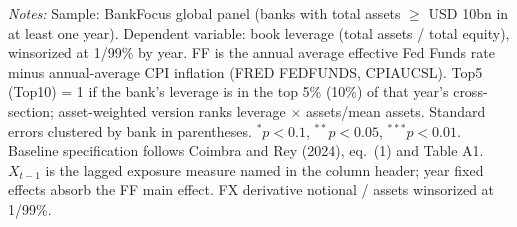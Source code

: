 \begin{table}[htbp]
\begin{threeparttable}
\begin{tablenotes}[flushleft]
\item \textit{Notes:} Sample: BankFocus global panel (banks with total assets $\geq$ USD 10bn in at least one year). Dependent variable: book leverage (total assets / total equity), winsorized at 1/99\% by year. FF is the annual average effective Fed Funds rate minus annual-average CPI inflation (FRED FEDFUNDS, CPIAUCSL). Top5 (Top10) = 1 if the bank's leverage is in the top 5\% (10\%) of that year's cross-section; asset-weighted version ranks leverage $\times$ assets/mean assets. Standard errors clustered by bank in parentheses. $^{*}p<0.1$, $^{**}p<0.05$, $^{***}p<0.01$. Baseline specification follows Coimbra and Rey (2024), eq.~(1) and Table A1. $X_{t-1}$ is the lagged exposure measure named in the column header; year fixed effects absorb the FF main effect. FX derivative notional / assets winsorized at 1/99\%.
\end{tablenotes}
\end{threeparttable}
\end{table}
